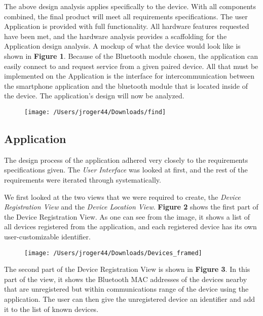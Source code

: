 \documentclass[12pt]{article}
\begin{document}
The above design analysis applies specifically to the device. With all components combined, the final product will meet all requirements specifications. The user Application is provided with full functionality. All hardware features requested have been met, and the hardware analysis provides a scaffolding for the Application design analysis. A mockup of what the device would look like is shown in \textbf{Figure 1}. Because of the Bluetooth module chosen, the application can easily connect to and request service from a given paired device. All that must be implemented on the Application is the interface for intercommunication between the smartphone application and the bluetooth module that is located inside of the device. The application’s design will now be analyzed.

\begin{figure}
	\centering
	\caption[Figure 1]{}
	\texttt{[image: /Users/jroger44/Downloads/find]}
	\label{fig:find}
\end{figure}

		\subsection{Application}
		The design process of the application adhered very closely to the requirements specifications given. The \emph{User Interface} was looked at first, and the rest of the requirements were iterated through systematically.
		
		We first looked at the two views that we were required to create, the \emph{Device Registration View} and the \emph{Device Location View}. \textbf{Figure 2} shows the first part of the Device Registration View. As one can see from the image, it shows a list of all devices registered from the application, and each registered device has its own user-customizable identifier.
		
\begin{figure}
\centering
\caption[Figure 2]{}
\texttt{[image: /Users/jroger44/Downloads/Devices\_framed]}
\label{fig:Devices_framed}
\end{figure}

		The second part of the Device Registration View is shown in \textbf{Figure 3}. In this part of the view, it shows the Bluetooth MAC addresses of the devices nearby that are unregistered but within communications range of the device using the application. The user can then give the unregistered device an identifier and add it to the list of known devices.
		
\end{document}
